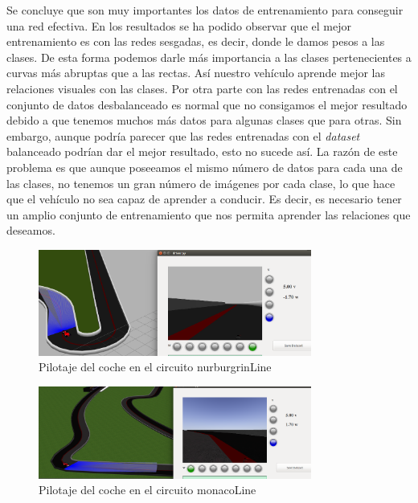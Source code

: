 Se concluye que son muy importantes los datos de entrenamiento para conseguir una red efectiva. En los resultados se ha podido observar que el mejor entrenamiento es con las redes sesgadas, es decir, donde le damos pesos a las clases. De esta forma podemos darle más importancia a las clases pertenecientes a curvas más abruptas que a las rectas. Así nuestro vehículo aprende mejor las relaciones visuales con las clases. Por otra parte con las redes entrenadas con el conjunto de datos desbalanceado es normal que no consigamos el mejor resultado debido a que tenemos muchos más datos para algunas clases que para otras. Sin embargo, aunque podría parecer que las redes entrenadas con el \textit{dataset} balanceado podrían dar el mejor resultado, esto no sucede así. La razón de este problema es que aunque poseeamos el mismo número de datos para cada una de las clases, no tenemos un gran número de imágenes por cada clase, lo que hace que el vehículo no sea capaz de aprender a conducir. Es decir, es necesario tener un amplio conjunto de entrenamiento que nos permita aprender las relaciones que deseamos.\\


\begin{figure}
\begin{center}
	\includegraphics[width=0.8\textwidth]{figures/Clasificacion/nurburgrin_class.png}
   \caption{Pilotaje del coche en el circuito nurburgrinLine}
	\label{fig.nurburgrin_class}
\end{center}
\end{figure}

\begin{figure}
\begin{center}
	\includegraphics[width=0.8\textwidth]{figures/Clasificacion/monaco_class.png}
   \caption{Pilotaje del coche en el circuito monacoLine}
	\label{fig.monaco_class}
\end{center}
\end{figure}

